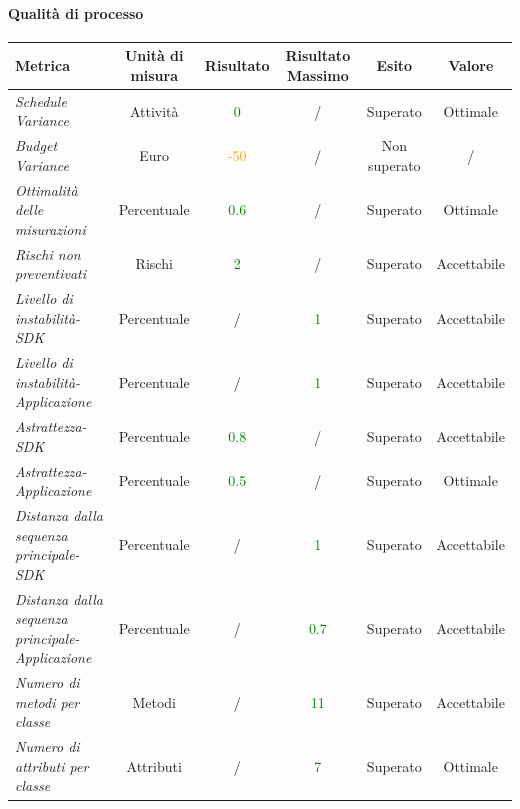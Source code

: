 \paragraph{Qualità di processo}
\begin{longtable}{|>{\centering}m{5cm}|c|c|c|c|c|}
\hline
\textbf{Metrica} & \textbf{Unità di misura} & \textbf{Risultato} & \textbf{Risultato Massimo} & \textbf{Esito} & \textbf{Valore}\\
\hline
\endhead

\emph{Schedule Variance} & {Attività} & \textcolor{Green}{0} & / & Superato & Ottimale\\ \hline
\emph{Budget Variance} & {Euro} & \textcolor{Orange}{-50} & / & Non superato & /\\ \hline
\emph{Ottimalità delle misurazioni} & {Percentuale} & \textcolor{Green}{0.6} & / & Superato & Ottimale \\ \hline
\emph{Rischi non preventivati} & {Rischi} & \textcolor{Green}{2} & / & Superato & Accettabile\\ \hline
\emph{Livello di instabilità-SDK} & {Percentuale} & / &\textcolor{Green}{1} & Superato & Accettabile\\ \hline
\emph{Livello di instabilità-Applicazione} & {Percentuale} & / &\textcolor{Green}{1} & Superato & Accettabile\\ \hline
\emph{Astrattezza-SDK} & {Percentuale} & \textcolor{Green}{0.8} & / & Superato & Accettabile\\ \hline
\emph{Astrattezza-Applicazione} & {Percentuale} & \textcolor{Green}{0.5} & / & Superato & Ottimale\\ \hline
\emph{Distanza dalla sequenza principale-SDK} & {Percentuale} & / &\textcolor{Green}{1} & Superato & Accettabile\\ \hline
\emph{Distanza dalla sequenza principale-Applicazione} & {Percentuale} & / &\textcolor{Green}{0.7} & Superato & Accettabile\\ \hline
\emph{Numero di metodi per classe} & {Metodi} & / &\textcolor{Green}{11} & Superato & Accettabile\\ \hline
\emph{Numero di attributi per classe} & {Attributi} & / &\textcolor{Green}{7} & Superato & Ottimale\\ \hline

\end{longtable}
